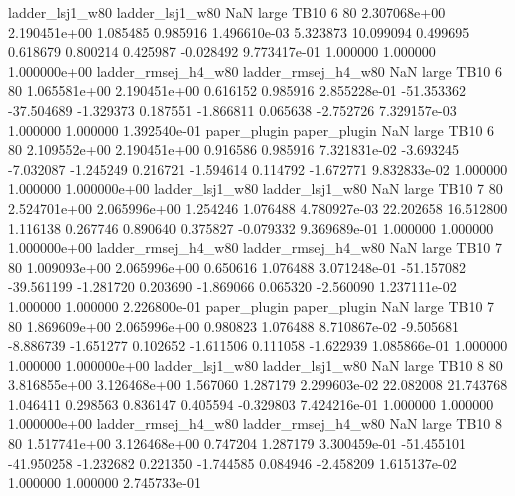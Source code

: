     ladder_lsj1_w80     ladder_lsj1_w80                   NaN      large     TB10                 6 80 2.307068e+00   2.190451e+00      1.085485       0.985916  1.496610e-03      5.323873     10.099094     0.499695       0.618679  0.800214   0.425987    -0.028492   9.773417e-01            1.000000        1.000000        1.000000e+00
ladder_rmsej_h4_w80 ladder_rmsej_h4_w80                   NaN      large     TB10                 6 80 1.065581e+00   2.190451e+00      0.616152       0.985916  2.855228e-01    -51.353362    -37.504689    -1.329373       0.187551 -1.866811   0.065638    -2.752726   7.329157e-03            1.000000        1.000000        1.392540e-01
       paper_plugin        paper_plugin                   NaN      large     TB10                 6 80 2.109552e+00   2.190451e+00      0.916586       0.985916  7.321831e-02     -3.693245     -7.032087    -1.245249       0.216721 -1.594614   0.114792    -1.672771   9.832833e-02            1.000000        1.000000        1.000000e+00
    ladder_lsj1_w80     ladder_lsj1_w80                   NaN      large     TB10                 7 80 2.524701e+00   2.065996e+00      1.254246       1.076488  4.780927e-03     22.202658     16.512800     1.116138       0.267746  0.890640   0.375827    -0.079332   9.369689e-01            1.000000        1.000000        1.000000e+00
ladder_rmsej_h4_w80 ladder_rmsej_h4_w80                   NaN      large     TB10                 7 80 1.009093e+00   2.065996e+00      0.650616       1.076488  3.071248e-01    -51.157082    -39.561199    -1.281720       0.203690 -1.869066   0.065320    -2.560090   1.237111e-02            1.000000        1.000000        2.226800e-01
       paper_plugin        paper_plugin                   NaN      large     TB10                 7 80 1.869609e+00   2.065996e+00      0.980823       1.076488  8.710867e-02     -9.505681     -8.886739    -1.651277       0.102652 -1.611506   0.111058    -1.622939   1.085866e-01            1.000000        1.000000        1.000000e+00
    ladder_lsj1_w80     ladder_lsj1_w80                   NaN      large     TB10                 8 80 3.816855e+00   3.126468e+00      1.567060       1.287179  2.299603e-02     22.082008     21.743768     1.046411       0.298563  0.836147   0.405594    -0.329803   7.424216e-01            1.000000        1.000000        1.000000e+00
ladder_rmsej_h4_w80 ladder_rmsej_h4_w80                   NaN      large     TB10                 8 80 1.517741e+00   3.126468e+00      0.747204       1.287179  3.300459e-01    -51.455101    -41.950258    -1.232682       0.221350 -1.744585   0.084946    -2.458209   1.615137e-02            1.000000        1.000000        2.745733e-01
